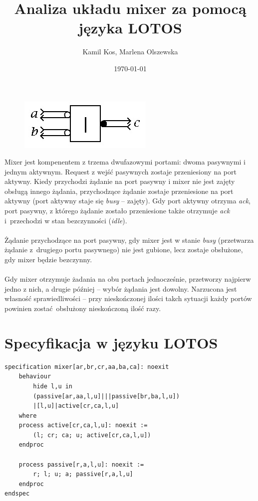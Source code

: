 \documentclass[12pt, a4paper, notitlepage]{article}
\title{Analiza układu mixer za pomocą języka LOTOS}
\author{Kamil Kos, Marlena Olszewska}
\date{\today}
\begin{document}
{\let\newpage\relax\maketitle}

\thispagestyle{empty}
\begin{figure}[!htb]
	\centering
\includegraphics[scale=0.7]{cd}
\end{figure}

Mixer jest kompenentem z trzema dwufazowymi portami: dwoma pasywnymi i jednym aktywnym. Request z wejść pasywnych zostaje przeniesiony na port aktywny. Kiedy przychodzi żądanie na port pasywny i mixer nie jest zajęty obsługą innego żądania, przychodzące żądanie zostaje przeniesione na port aktywny (port aktywny staje się \textit{busy} -- zajęty). Gdy port aktywny otrzyma \textit{ack}, port pasywny, z którego żądanie zostało przeniesione także otrzymuje \textit{ack} i~przechodzi w stan bezczynności (\textit{idle}).
\\\\
Żądanie przychodzące na port pasywny, gdy mixer jest w stanie \textit{busy} (przetwarza żądanie z~drugiego portu pasywnego) nie jest gubione, lecz zostaje obsłużone, gdy mixer będzie bezczynny.
\\\\
Gdy mixer otrzymuje żadania na obu portach jednocześnie, przetworzy najpierw jedno z nich, a drugie później -- wybór żądania jest dowolny. Narzucona jest własność sprawiedliwości -- przy nieskończonej ilości takch sytuacji każdy portów powinien zostać obsłużony nieskończoną ilość razy.

\section*{Specyfikacja w języku LOTOS}
\begin{lstlisting}
specification mixer[ar,br,cr,aa,ba,ca]: noexit
	behaviour
		hide l,u in
		(passive[ar,aa,l,u]|||passive[br,ba,l,u])
		|[l,u]|active[cr,ca,l,u]
	where
	process active[cr,ca,l,u]: noexit :=
		(l; cr; ca; u; active[cr,ca,l,u])
	endproc
	
	process passive[r,a,l,u]: noexit :=
		r; l; u; a; passive[r,a,l,u]
	endproc
endspec

\end{lstlisting}
\end{document}
